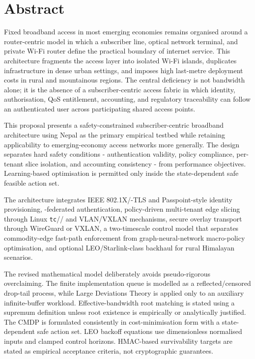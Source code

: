 \chapter*{Abstract}
\thispagestyle{fancy}

Fixed broadband access in most emerging economies remains organised around a router-centric model in which a subscriber line, optical network terminal, and private Wi-Fi router define the practical boundary of internet service. This architecture fragments the access layer into isolated Wi-Fi islands, duplicates infrastructure in dense urban settings, and imposes high last-metre deployment costs in rural and mountainous regions. The central deficiency is not bandwidth alone; it is the absence of a subscriber-centric access fabric in which identity, authorisation, QoS entitlement, accounting, and regulatory traceability can follow an authenticated user across participating shared access points.

This proposal presents a safety-constrained subscriber-centric broadband architecture using Nepal as the primary empirical testbed while retaining applicability to emerging-economy access networks more generally. The design separates hard safety conditions - authentication validity, policy compliance, per-tenant slice isolation, and accounting consistency - from performance objectives. Learning-based optimisation is permitted only inside the state-dependent safe feasible action set.

The architecture integrates IEEE 802.1X/\eap{}-TLS and Passpoint-style identity provisioning, \radsec{}-federated \radius{} authentication, policy-driven multi-tenant edge slicing through Linux \texttt{tc}/\htb{}/\fqcodel{} and VLAN/VXLAN mechanisms, secure overlay transport through WireGuard or VXLAN, a two-timescale control model that separates commodity-edge fast-path enforcement from graph-neural-network macro-policy optimisation, and optional LEO/Starlink-class backhaul for rural Himalayan scenarios.

The revised mathematical model deliberately avoids pseudo-rigorous overclaiming. The finite implementation queue is modelled as a reflected/censored drop-tail process, while Large Deviations Theory is applied only to an auxiliary infinite-buffer workload. Effective-bandwidth root matching is stated using a supremum definition unless root existence is empirically or analytically justified. The CMDP is formulated consistently in cost-minimisation form with a state-dependent safe action set. LEO backoff equations use dimensionless normalised inputs and clamped control horizons. HMAC-based survivability targets are stated as empirical acceptance criteria, not cryptographic guarantees.

